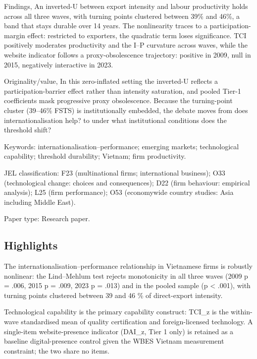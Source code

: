 \documentclass[12pt,a4paper]{article}
\begin{document}
Findings, An inverted-U between export intensity and labour productivity
holds across all three waves, with turning points clustered between 39\%
and 46\%, a band that stays durable over 14 years. The nonlinearity
traces to a participation-margin effect: restricted to exporters, the
quadratic term loses significance. TCI positively moderates productivity
and the I--P curvature across waves, while the website indicator follows
a proxy-obsolescence trajectory: positive in 2009, null in 2015,
negatively interactive in 2023.

Originality/value, In this zero-inflated setting the inverted-U reflects
a participation-barrier effect rather than intensity saturation, and
pooled Tier-1 coefficients mask progressive proxy obsolescence. Because
the turning-point cluster (39--46\% FSTS) is institutionally embedded,
the debate moves from \textquotesingle does internationalisation
help?\textquotesingle{} to \textquotesingle under what institutional
conditions does the threshold shift?\textquotesingle{}

Keywords: internationalisation--performance; emerging markets;
technological capability; threshold durability; Vietnam; firm
productivity.

JEL classification: F23 (multinational firms; international business);
O33 (technological change: choices and consequences); D22 (firm
behaviour: empirical analysis); L25 (firm performance); O53 (economywide
country studies: Asia including Middle East).

Paper type: Research paper.

\hypertarget{highlights}{%
\subsection{Highlights}\label{highlights}}

The internationalisation--performance relationship in Vietnamese firms
is robustly nonlinear: the Lind--Mehlum test rejects monotonicity in all
three waves (2009 p = .006, 2015 p = .009, 2023 p = .013) and in the
pooled sample (p \textless{} .001), with turning points clustered
between 39 and 46 \% of direct-export intensity.

Technological capability is the primary capability construct: TCI\_z is
the within-wave standardised mean of quality certification and
foreign-licensed technology. A single-item website-presence indicator
(DAI\_z, Tier 1 only) is retained as a baseline digital-presence control
given the WBES Vietnam measurement constraint; the two share no items.
\end{document}
